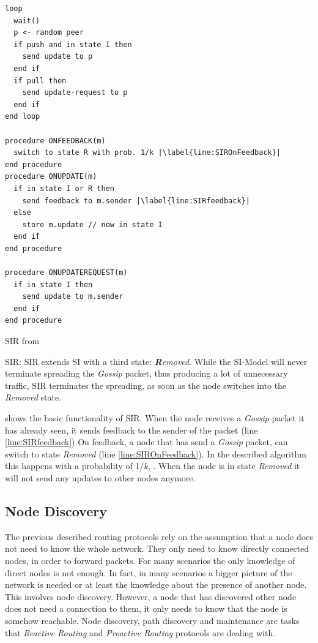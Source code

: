 \begin{Listing}
\begin{lstlisting}[multicols=2,basicstyle=\tiny,basicstyle=\footnotesize\ttfamily,xleftmargin=3em]
loop
  wait()
  p <- random peer
  if push and in state I then
    send update to p
  end if
  if pull then
    send update-request to p
  end if
end loop

procedure ONFEEDBACK(m)
  switch to state R with prob. 1/k |\label{line:SIROnFeedback}|
end procedure
procedure ONUPDATE(m)
  if in state I or R then
    send feedback to m.sender |\label{line:SIRfeedback}|
  else
    store m.update // now in state I
  end if
end procedure

procedure ONUPDATEREQUEST(m)
  if in state I then
    send update to m.sender
  end if
end procedure
\end{lstlisting}
\caption{SIR from \cite[\S1.2.2.2]{Jelasity2011}}
\label{lst:SIRAlgo}
\end{Listing}

SIR:
SIR extends SI with a third state: \textit{\textbf{R}emoved}. While the SI-Model will never terminate spreading the \textit{Gossip} packet, thus producing a lot of unnecessary traffic, SIR terminates the spreading, as soon as the node switches into the \textit{Removed} state.

 shows the basic functionality of SIR. 
When the node receives a \textit{Gossip} packet it has already seen, it sends feedback to the sender of the packet (line \ref{line:SIRfeedback})
On feedback, a node that has send a \textit{Gossip} packet, can switch to state \textit{Removed} (line \ref{line:SIROnFeedback}). In the described algorithm this happens with a probability of 1/\textit{k}, \cite[\S1.2.2.2]{Jelasity2011}. When the node is in state \textit{Removed} it will not send any updates to other nodes anymore.

\subsection{Node Discovery}
The previous described routing protocols rely on the assumption that a node does not need to know the whole network. They only need to know directly connected nodes, in order to forward packets.
For many scenarios the only knowledge of direct nodes is not enough. In fact, in many scenarios a bigger picture of the network is needed or at least the knowledge about the presence of another node. This involves node discovery. However, a node that has discovered other node does not need a connection to them, it only needs to know that the node is somehow reachable.
Node discovery, path discovery and maintenance are tasks that \textit{Reactive Routing} and \textit{Proactive Routing} protocols are dealing with.

